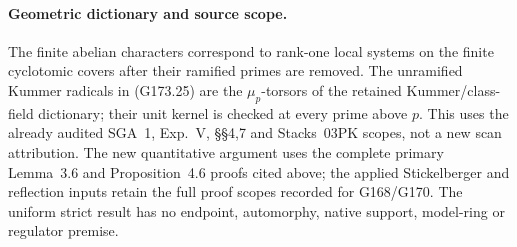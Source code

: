 \paragraph{Geometric dictionary and source scope.}
The finite abelian characters correspond to rank-one local systems
on the finite cyclotomic covers after their ramified primes are
removed.  The unramified Kummer radicals in (G173.25) are the
$\mu_p$-torsors of the retained Kummer/class-field dictionary;
their unit kernel is checked at every prime above $p$.
This uses the already audited SGA~1, Exp.~V, \S\S4,7 and
Stacks~03PK scopes, not a new scan attribution.
The new quantitative argument uses the complete primary
Lemma~3.6 and Proposition~4.6 proofs cited above; the applied
Stickelberger and reflection inputs retain the full proof scopes
recorded for G168/G170.  The uniform strict result has no endpoint,
automorphy, native support, model-ring or regulator premise.
